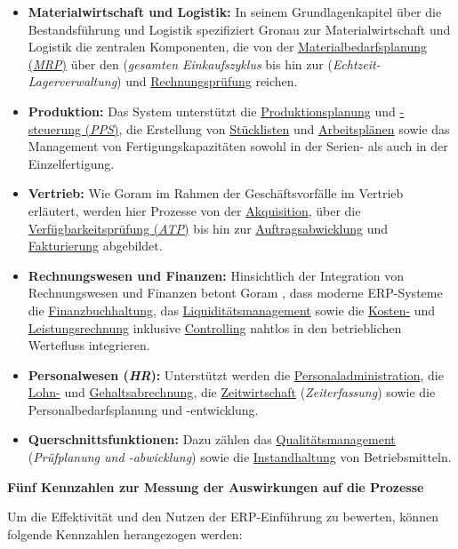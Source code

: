 \begin{itemize}
    \item \textbf{Materialwirtschaft und Logistik:} In seinem Grundlagenkapitel über die Bestandsführung und Logistik spezifiziert Gronau \cite[80]{8} zur Materialwirtschaft und Logistik die zentralen Komponenten, die von der \uline{Materialbedarfsplanung (\textit{\acs{MRP}})} über den (\textit{gesamten Einkaufszyklus} bis hin zur (\textit{Echtzeit-Lagerverwaltung}) und \uline{Rechnungsprüfung} reichen.
    \item \textbf{Produktion:} Das System unterstützt die \uline{Produktionsplanung} und \uline{-steuerung (\textit{\acs{PPS}})}, die Erstellung von \uline{Stücklisten} und \uline{Arbeitsplänen} sowie das Management von Fertigungskapazitäten sowohl in der Serien- als auch in der Einzelfertigung.
    \item \textbf{Vertrieb:} Wie Goram \cite[39]{30} im Rahmen der Geschäftsvorfälle im Vertrieb erläutert, werden hier Prozesse von der \uline{Akquisition}, über die \uline{Verfügbarkeitsprüfung (\textit{\acs{ATP}})} bis hin zur \uline{Auftragsabwicklung} und \uline{Fakturierung} abgebildet.
    \item \textbf{Rechnungswesen und Finanzen:} Hinsichtlich der Integration von Rechnungswesen und Finanzen betont Goram \cite[57]{31}, dass moderne \acs{ERP}-Systeme die \uline{Finanzbuchhaltung}, das \uline{Liquiditätsmanagement} sowie die \uline{Kosten-} und \uline{Leistungsrechnung} inklusive \uline{Controlling} nahtlos in den betrieblichen Wertefluss integrieren.
    \item \textbf{Personalwesen (\textit{\acs{HR}}):} Unterstützt werden die \uline{Personaladministration}, die \uline{Lohn-} und \uline{Gehaltsabrechnung}, die \uline{Zeitwirtschaft} (\textit{Zeiterfassung}) sowie die Personalbedarfsplanung und -entwicklung.
    \item \textbf{Querschnittsfunktionen:} Dazu zählen das \uline{Qualitätsmanagement} (\textit{Prüfplanung und -abwicklung}) sowie die \uline{Instandhaltung} von Betriebsmitteln.
\end{itemize}
\textbf{Fünf Kennzahlen zur Messung der Auswirkungen auf die Prozesse} \par Um die Effektivität und den Nutzen der \acs{ERP}-Einführung zu bewerten, können folgende Kennzahlen herangezogen werden:
